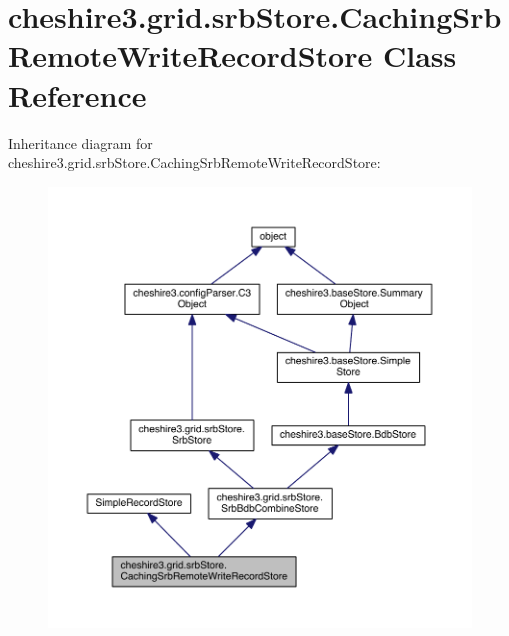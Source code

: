 \hypertarget{classcheshire3_1_1grid_1_1srb_store_1_1_caching_srb_remote_write_record_store}{\section{cheshire3.\-grid.\-srb\-Store.\-Caching\-Srb\-Remote\-Write\-Record\-Store Class Reference}
\label{classcheshire3_1_1grid_1_1srb_store_1_1_caching_srb_remote_write_record_store}
}


Inheritance diagram for cheshire3.\-grid.\-srb\-Store.\-Caching\-Srb\-Remote\-Write\-Record\-Store\-:
\nopagebreak
\begin{figure}[H]
\begin{center}
\leavevmode
\includegraphics[width=350pt]{classcheshire3_1_1grid_1_1srb_store_1_1_caching_srb_remote_write_record_store__inherit__graph}
\end{center}
\end{figure}


